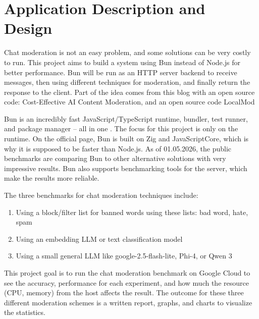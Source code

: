 \documentclass[
	english,
	accentcolor=9c,
	type=intern,
	marginpar=false,
	11pt
]{tudapub}
\begin{document}

\section{Application Description and Design}
\label{section1}
Chat moderation is not an easy problem, and some solutions can be very costly to run.
This project aims to build a system using Bun instead of Node.js for better performance.
Bun will be run as an HTTP server backend to receive messages, then using different techniques for moderation, and finally return the response to the client.
Part of the idea comes from this blog with an open source code: Cost-Effective AI Content Moderation\cite{cost-effective-moderation}, and an open source code LocalMod\cite{localmod}

Bun is an incredibly fast JavaScript/TypeScript runtime, bundler, test runner, and package manager – all in one \cite{bun-runtime}. The focus for this project is only on the runtime. On the official page, Bun is built on Zig and JavaScriptCore, which is why it is supposed to be faster than Node.js.
As of 01.05.2026, the public benchmarks are comparing Bun to other alternative solutions with very impressive results.
Bun also supports benchmarking tools for the server, which make the results more reliable.

The three benchmarks for chat moderation techniques include:
\begin{enumerate}
    \item Using a block/filter list for banned words using these lists: bad word\cite{ldnoobw-list}, hate\cite{hate-speech}, spam\cite{localmod}
    \item Using an embedding LLM or text classification model
    \item Using a small general LLM like google-2.5-flash-lite, Phi-4, or Qwen 3
\end{enumerate}



This project goal is to run the chat moderation benchmark on Google Cloud to see the accuracy, performance for each experiment, and how much the resource (CPU, memory) from the host affects the result.
The outcome for these three different moderation schemes is a written report, graphs, and charts to visualize the statistics.
\end{document}
